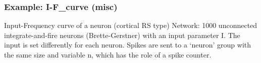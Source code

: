 \documentclass[letterpaper,10pt,english]{manual}
\begin{document}
\resetcurrentobjects
\hypertarget{--doc-examples-misc_I-F_curve}{}

\hypertarget{index-36}{}\subsubsection{Example: I-F\_curve (misc)}

Input-Frequency curve of a neuron (cortical RS type)
Network: 1000 unconnected integrate-and-fire neurons (Brette-Gerstner)
with an input parameter I.
The input is set differently for each neuron.
Spikes are sent to a `neuron' group with the same size and variable n,
which has the role of a spike counter.
\end{document}
